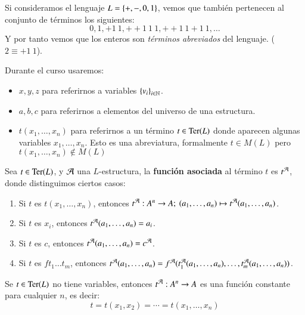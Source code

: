 \begin{obs}
    Si consideramos el lenguaje $L = \left\{+, -, 0, 1\right\}$, vemos que también pertenecen al conjunto de términos los siguientes:
    $$
        0, 1, + 1\ 1, + + 1\ 1\ 1, + + 1\ 1 + 1\ 1, \ldots
    $$
    Y por tanto vemos que los enteros son \textit{términos abreviados} del lenguaje. ($2 \equiv + 1\ 1$).
\end{obs}

\begin{obs}[Notación]
    Durante el curso usaremos:
    \begin{itemize}
        \item $x, y, z$ para referirnos a variables $\left\{v_i\right\}_{i\in \mathbb{N}}$.
        \item $a, b, c$ para referirnos a elementos del universo de una estructura.
        \item $t(x_1, \ldots, x_n)$ para referirnos a un término $t \in \mathrm{Ter}(L)$ donde aparecen algunas variables $x_1, \ldots, x_n$. Esto es una abreviatura, formalmente $t \in M(L)$ pero $t(x_1, \ldots, x_n) \notin M(L)$
    \end{itemize}
\end{obs}

\begin{dfn}
    Sea $t \in \mathrm{Ter}(L)$, y $\mathcal{A}$ una $L$-estructura, la \textbf{función asociada} al término $t$ es $t^{\mathcal{A}}$, donde distinguimos ciertos casos:
    \begin{enumerate}
        \item Si $t$ es $t(x_1, \ldots, x_n)$, entonces $t^{\mathcal{A}}: A^n \to A;\ (a_1,\ldots, a_n) \mapsto t^{\mathcal{A}} (a_1, \ldots, a_n)$.
        \item Si $t$ es $x_i$, entonces $t^{\mathcal{A}}(a_1, \ldots, a_n) = a_i$.
        \item Si $t$ es $c$, entonces $t^{\mathcal{A}}(a_1, \ldots, a_n) = c^{\mathcal{A}}$.
        \item Si $t$ es $f t_1 \ldots t_m$, entonces $t^{\mathcal{A}}(a_1, \ldots, a_n) = f^{\mathcal{A}}(t_1^{\mathcal{A}}(a_1, \ldots, a_n), \ldots, t_m^{\mathcal{A}}(a_1, \ldots, a_n))$.
    \end{enumerate}
\end{dfn}

\begin{obs}
    Se $t \in \mathrm{Ter}(L)$ no tiene variables, entonces $t^{\mathcal{A}}: A^n \to A$ es una función constante para cualquier $n$, es decir:
    $$
        t = t(x_1, x_2) = \cdots = t(x_1, \ldots, x_n)
    $$
\end{obs}

